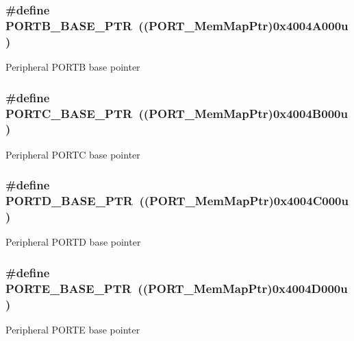 \subsubsection[{P\+O\+R\+T\+B\+\_\+\+B\+A\+S\+E\+\_\+\+P\+T\+R}]{\setlength{\rightskip}{0pt plus 5cm}\#define P\+O\+R\+T\+B\+\_\+\+B\+A\+S\+E\+\_\+\+P\+T\+R~(({\bf P\+O\+R\+T\+\_\+\+Mem\+Map\+Ptr})0x4004\+A000u)}\label{group___p_o_r_t___peripheral_ga585b4782d1ceb44492289af0019480f9}
Peripheral P\+O\+R\+T\+B base pointer \hypertarget{group___p_o_r_t___peripheral_ga03c740cdda17711afafc932723871474}{}
\subsubsection[{P\+O\+R\+T\+C\+\_\+\+B\+A\+S\+E\+\_\+\+P\+T\+R}]{\setlength{\rightskip}{0pt plus 5cm}\#define P\+O\+R\+T\+C\+\_\+\+B\+A\+S\+E\+\_\+\+P\+T\+R~(({\bf P\+O\+R\+T\+\_\+\+Mem\+Map\+Ptr})0x4004\+B000u)}\label{group___p_o_r_t___peripheral_ga03c740cdda17711afafc932723871474}
Peripheral P\+O\+R\+T\+C base pointer \hypertarget{group___p_o_r_t___peripheral_ga7f5a263751543810ebfdbde278383276}{}
\subsubsection[{P\+O\+R\+T\+D\+\_\+\+B\+A\+S\+E\+\_\+\+P\+T\+R}]{\setlength{\rightskip}{0pt plus 5cm}\#define P\+O\+R\+T\+D\+\_\+\+B\+A\+S\+E\+\_\+\+P\+T\+R~(({\bf P\+O\+R\+T\+\_\+\+Mem\+Map\+Ptr})0x4004\+C000u)}\label{group___p_o_r_t___peripheral_ga7f5a263751543810ebfdbde278383276}
Peripheral P\+O\+R\+T\+D base pointer \hypertarget{group___p_o_r_t___peripheral_gab166fe285bbb15b52de610f408fe25d3}{}
\subsubsection[{P\+O\+R\+T\+E\+\_\+\+B\+A\+S\+E\+\_\+\+P\+T\+R}]{\setlength{\rightskip}{0pt plus 5cm}\#define P\+O\+R\+T\+E\+\_\+\+B\+A\+S\+E\+\_\+\+P\+T\+R~(({\bf P\+O\+R\+T\+\_\+\+Mem\+Map\+Ptr})0x4004\+D000u)}\label{group___p_o_r_t___peripheral_gab166fe285bbb15b52de610f408fe25d3}
Peripheral P\+O\+R\+T\+E base pointer \hypertarget{group___p_o_r_t___peripheral_gadda5d5c0c6f7d718ac2ea336aea4f905}{}
